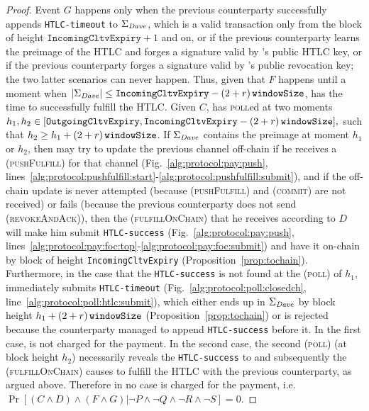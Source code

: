 \begin{proof}
  Event $G$ happens only when the previous counterparty successfully appends
  \texttt{HTLC-timeout} to $\Sigma_{\mathit{Dave}}$, which is a valid transaction only
  from the block of height $\mathtt{IncomingCltvExpiry} + 1$ and on, or if the
  previous counterparty learns the preimage of the HTLC and forges a signature
  valid by \dave's public HTLC key, or if the previous counterparty forges a
  signature valid by \dave's public revocation key; the two latter scenarios can
  never happen. Thus, given that $F$ happens until a moment when
  $|\Sigma_{\mathit{Dave}}| \leq \mathtt{IncomingCltvExpiry} - \left(2 + r\right)\texttt{windowSize}{}$, \dave{} has
  the time to successfully fulfill the HTLC. Given $C$, \dave{} has
  \textsc{poll}ed at two moments $h_1, h_2 \in [\mathtt{OutgoingCltvExpiry},
  \mathtt{IncomingCltvExpiry} - \left(2 + r\right)\texttt{windowSize}{}],$ such that $h_2 \geq h_1 +
  \left(2 + r\right)\texttt{windowSize}{}$. If $\Sigma_{\mathit{Dave}}$ contains the preimage at moment $h_1$ or
  $h_2$, then \dave{} may try to update the previous channel off-chain if he
  receives a (\textsc{pushFulfill}) for that channel
  (Fig.~\ref{alg:protocol:pay:push},
  lines~\ref{alg:protocol:pushfulfill:start}-\ref{alg:protocol:pushfulfill:submit}),
  and if the off-chain update is never attempted (because (\textsc{pushFulfill})
  and (\textsc{commit}) are not received) or fails (because the previous
  counterparty does not send (\textsc{revokeAndAck})), then the
  (\textsc{fulfillOnChain}) that he receives according to $D$ will make him
  submit \texttt{HTLC-success} (Fig.~\ref{alg:protocol:pay:push},
  lines~\ref{alg:protocol:pay:foc:top}-\ref{alg:protocol:pay:foc:submit}) and
  have it on-chain by block of height \texttt{IncomingCltvExpiry}
  (Proposition~\ref{prop:tochain}). Furthermore, in the case that the
  \texttt{HTLC-success} is not found at the (\textsc{poll}) of $h_1$, \dave{}
  immediately submits \texttt{HTLC-timeout}
  (Fig.~\ref{alg:protocol:poll:closedch},
  line~\ref{alg:protocol:poll:htlc:submit}), which either ends up in
  $\Sigma_{\mathit{Dave}}$ by block height $h_1 + \left(2 + r\right)\texttt{windowSize}{}$
  (Proposition~\ref{prop:tochain}) or is rejected because the counterparty
  managed to append \texttt{HTLC-success} before it. In the first case, \dave{}
  is not charged for the payment. In the second case, the second (\textsc{poll})
  (at block height $h_2$) necessarily reveals the \texttt{HTLC-success} to
  \dave{} and subsequently the (\textsc{fulfillOnChain}) causes \dave{} to
  fulfill the HTLC with the previous counterparty, as argued above. Therefore in
  no case \dave{} is charged for the payment, i.e. $\Pr[(C \wedge D) \wedge (F
  \wedge G) | \neg P \wedge \neg Q \wedge \neg R \wedge \neg S] = 0$.


\end{proof}
